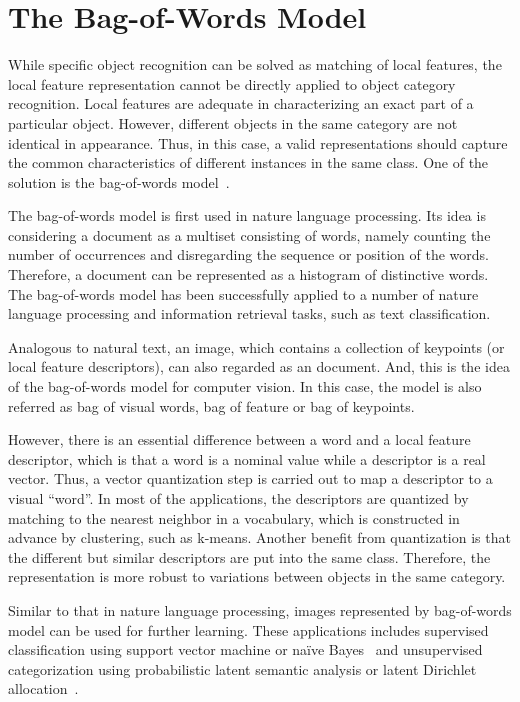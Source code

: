 \documentclass[12pt,final,twoside]{report}
\theoremstyle{plain}
\theoremstyle{definition}
\theoremstyle{remark}
\begin{document}
\section{The Bag-of-Words Model}
While specific object recognition can be solved as matching of local features, the local feature representation cannot be directly applied to object category recognition. Local features are adequate in characterizing an exact part of a particular object. However, different objects in the same category are not identical in appearance. Thus, in this case, a valid representations should capture the common characteristics of different instances in the same class. One of the solution is the bag-of-words model~\cite{csurka_visual_2004}.

The bag-of-words model is first used in nature language processing. Its idea is considering a document as a multiset consisting of words, namely counting the number of occurrences and disregarding the sequence or position of the words. Therefore, a document can be represented as a histogram of distinctive words. The bag-of-words model has been successfully applied to a number of nature language processing and information retrieval tasks, such as text classification.

Analogous to natural text, an image, which contains a collection of keypoints (or local feature descriptors), can also regarded as an document. And, this is the idea of the bag-of-words model for computer vision. In this case, the model is also referred as bag of visual words, bag of feature or bag of keypoints. 

However, there is an essential difference between a word and a local feature descriptor, which is that a word is a nominal value while a descriptor is a real vector. Thus, a vector quantization step is carried out to map a descriptor to a visual ``word''. In most of the applications, the descriptors are quantized by matching to the nearest neighbor in a vocabulary, which is constructed in advance by clustering, such as k-means. Another benefit from quantization is that the different but similar descriptors are put into the same class. Therefore, the representation is more robust to variations between objects in the same category.

Similar to that in nature language processing, images represented by bag-of-words model can be used for further learning. These applications includes supervised classification using support vector machine or na\"ive Bayes~\cite{csurka_visual_2004} and unsupervised categorization using probabilistic latent semantic analysis or latent Dirichlet allocation~\cite{sivic_discovering_2005}.
\end{document}
